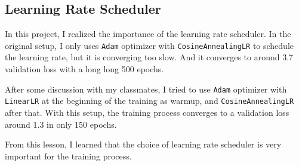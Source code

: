 \subsection{Learning Rate Scheduler}
In this project, I realized the importance of the learning rate scheduler.
In the original setup, I only uses \texttt{Adam} optimizer with \texttt{CosineAnnealingLR} to schedule the learning rate, but it is converging too slow. And it converges to around 3.7 validation loss with a long long 500 epochs.

After some discussion with my classmates, I tried to use \texttt{Adam} optimizer with \texttt{LinearLR} at the beginning of the training as warmup, and \texttt{CosineAnnealingLR} after that.
With this setup, the training process converges to a validation loss around 1.3 in only 150 epochs.

From this lesson, I learned that the choice of learning rate scheduler is very important for the training process.
